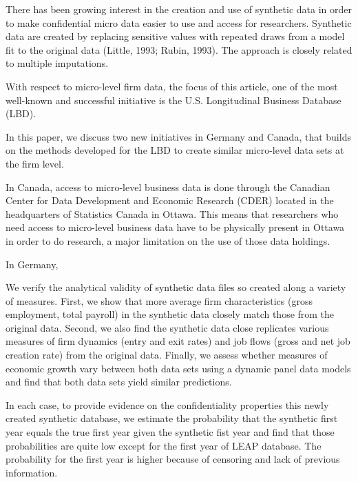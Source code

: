 There has been growing interest in the creation and use of synthetic data in order to make confidential micro data easier to use and access for researchers. Synthetic data are created by replacing sensitive values with repeated draws from a model fit to the original data (Little, 1993; Rubin, 1993). The approach is closely related to multiple imputations.



With respect to micro-level firm data, the focus of this article, one of the most well-known and successful initiative is the U.S. Longitudinal Business Database (LBD).  


In this paper, we discuss two new initiatives in Germany and Canada, that builds on the methods developed for the LBD to create similar micro-level data sets at the firm level. 

In Canada, access to micro-level business data is done through the Canadian Center for Data Development and Economic Research (CDER) located in the headquarters of Statistics Canada in Ottawa. This means that researchers who need access to micro-level business data have to be physically present in Ottawa in order to do research, a major limitation on the use of those data holdings.

In Germany, 

We verify the analytical validity of synthetic data files so created along a variety of measures. First, we show that more average firm characteristics (gross employment, total payroll) in the synthetic data closely match those from the original data. Second, we also find the synthetic data close replicates various measures of firm dynamics (entry and exit rates) and job flows (gross and net job creation rate) from the original data. Finally, we assess whether measures of economic growth vary between both data sets using a dynamic panel data models and find that both data sets yield similar predictions.

In each case, to provide evidence on the confidentiality properties this newly created  synthetic database, we estimate the probability that the synthetic first year equals the true first year given the synthetic fist year and find that those probabilities are quite low except for the first year of LEAP database. The probability for the first year is higher because of censoring and lack of previous information.

